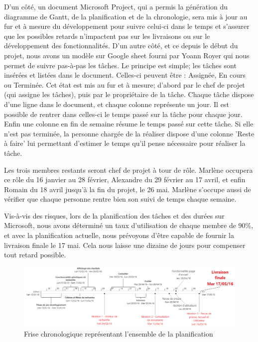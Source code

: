 	D'un côté, un document Microsoft Project, qui a permis la génération du diagramme de Gantt, de la planification et de la chronologie, sera mis à jour au fur et à mesure du développement pour suivre celui-ci dans le temps et s'assurer que les possibles retards n'impactent pas sur les livraisons ou sur le développement des fonctionnalités. D'un autre côté, et ce depuis le début du projet, nous avons un modèle sur Google sheet fourni par Yoann Royer qui nous permet de suivre pas-à-pas les tâches. Le principe est simple; les tâches sont insérées et listées dans le document. Celles-ci peuvent être : Assignée, En cours ou Terminée. Cet état est mis au fur et à mesure; d'abord par le chef de projet (qui assigne les tâches), puis par le propriétaire de la tâche. Chaque tâche dispose d'une ligne dans le document, et chaque colonne représente un jour. Il est possible de rentrer dans celles-ci le temps passé sur la tâche pour chaque jour. Enfin une colonne en fin de semaine résume le temps passé sur cette tâche. Si elle n'est pas terminée, la personne chargée de la réaliser dispose d'une colonne 'Reste à faire' lui permettant d'estimer le temps qu'il pense nécessaire pour réaliser la tâche.

	Les trois membres restants seront chef de projet à tour de rôle. Marlène occupera ce rôle du 16 janvier au 28 février, Alexandre du 29 février au 17 avril, et enfin Romain du 18 avril jusqu'à la fin du projet, le 26 mai. Marlène s'occupe aussi de vérifier que chaque personne rentre bien son suivi de temps chaque semaine.

	Vis-à-vis des risques, lors de la planification des tâches et des durées sur Microsoft, nous avons déterminé un taux d'utilisation de chaque membre de 90\%, et avec la planification actuelle, nous prévoyons d'être capable de fournir la livraison finale le 17 mai. Cela nous laisse une dizaine de jours pour compenser tout retard possible.



	\begin{figure}[H]
        \centering
        \includegraphics[width=1.3\textwidth, angle=90]{figure/frise.png}
            \caption{Frise chronologique représentant l'ensemble de la planification}
            \label{fig:frise}
    \end{figure}
